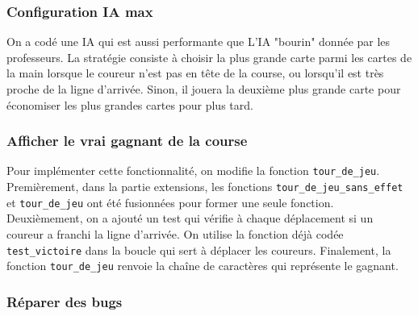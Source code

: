 \documentclass{article}
\begin{document}
\subsubsection{Configuration IA max}

On a codé une IA qui est aussi performante que L'IA "bourin" donnée par les professeurs. La stratégie consiste à choisir la plus grande carte parmi les cartes de la main lorsque le coureur n'est pas en tête de la course, ou lorsqu'il est très proche de la ligne d'arrivée. Sinon, il jouera la deuxième plus grande carte pour économiser les plus grandes cartes pour plus tard.

\subsubsection{Afficher le vrai gagnant de la course}

Pour implémenter cette fonctionnalité, on modifie la fonction \texttt{tour\_de\_jeu}. Premièrement, dans la partie extensions, les fonctions \texttt{tour\_de\_jeu\_sans\_effet} et \texttt{tour\_de\_jeu} ont été fusionnées pour former une seule fonction. Deuxièmement, on a ajouté un test qui vérifie à chaque déplacement si un coureur a franchi la ligne d'arrivée. On utilise la fonction déjà codée \texttt{test\_victoire} dans la boucle qui sert à déplacer les coureurs. Finalement, la fonction \texttt{tour\_de\_jeu} renvoie la chaîne de caractères qui représente le gagnant.

\subsubsection{Réparer des bugs}
\end{document}
